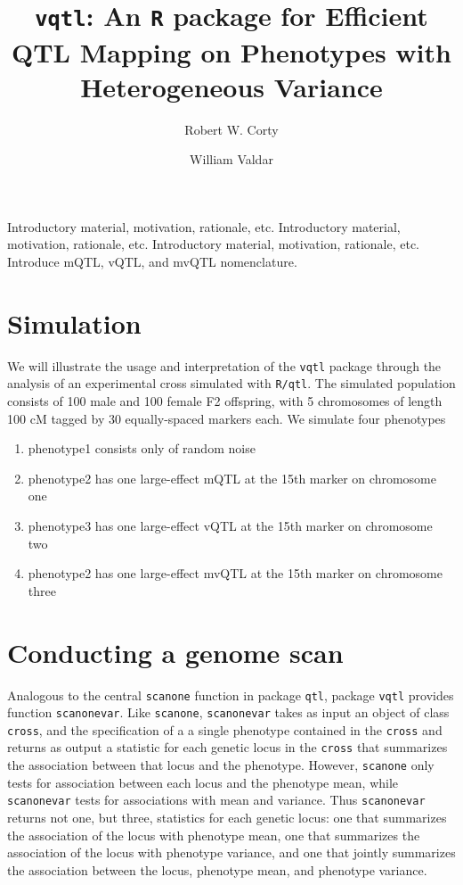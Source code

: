 \documentclass[9pt,twocolumn,twoside]{gsag3jnl}
\title{\texttt{vqtl}: An \texttt{R} package for Efficient QTL Mapping on Phenotypes with Heterogeneous Variance}
\author[$\ast$]{Robert W. Corty}
\author[$\ast, 1$]{William Valdar}
\affil[$\ast$]{Department of Genetics, University of North Carolina at Chapel Hill}
\begin{document}
\maketitle
\thispagestyle{firststyle}
\logomark
\articletypemark
\marginmark
\firstpagefootnote
{}
\vspace{-11pt}%

\noindent Introductory material, motivation, rationale, etc.  Introductory material, motivation, rationale, etc.  Introductory material, motivation, rationale, etc.  Introduce mQTL, vQTL, and mvQTL nomenclature.

\section*{Simulation}

We will illustrate the usage and interpretation of the \texttt{vqtl} package through the analysis of an experimental cross simulated with \texttt{R/qtl}.
The simulated population consists of 100 male and 100 female F2 offspring, with 5 chromosomes of length 100 cM tagged by 30 equally-spaced markers each.
We simulate four phenotypes

\begin{enumerate}
	\item phenotype1 consists only of random noise
	\item phenotype2 has one large-effect mQTL at the 15th marker on chromosome one
	\item phenotype3 has one large-effect vQTL at the 15th marker on chromosome two
	\item phenotype2 has one large-effect mvQTL at the 15th marker on chromosome three
\end{enumerate}


\section*{Conducting a genome scan}

Analogous to the central \texttt{scanone} function in package \texttt{qtl}, package \texttt{vqtl} provides function \texttt{scanonevar}.
Like \texttt{scanone}, \texttt{scanonevar} takes as input an object of class \texttt{cross}, and the specification of a a single phenotype contained in the \texttt{cross} and returns as output a statistic for each genetic locus in the \texttt{cross} that summarizes the association between that locus and the phenotype.
However, \texttt{scanone} only tests for association between each locus and the phenotype mean, while \texttt{scanonevar} tests for associations with mean and variance.
Thus \texttt{scanonevar} returns not one, but three, statistics for each genetic locus: one that summarizes the association of the locus with phenotype mean, one that summarizes the association of the locus with phenotype variance, and one that jointly summarizes the association between the locus, phenotype mean, and phenotype variance.
\end{document}
